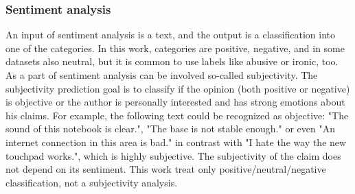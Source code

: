 \subsubsection{Sentiment analysis}
An input of sentiment analysis is a text, and the output is a classification into one of the categories. In this work, categories are positive, negative, and in some datasets also neutral, but it is common to use labels like abusive or ironic, too.
As a part of sentiment analysis can be involved so-called subjectivity\citep{Montoyo2012}. The subjectivity prediction goal is to classify if the
opinion (both positive or negative) is objective or the author is personally interested and has strong emotions about his claims. For example, the following text could be recognized as objective: "The sound of this notebook is clear.", "The base is not stable enough." or even "An internet connection in this area is bad." in contrast with "I hate the way the new touchpad works.", which is highly subjective. The subjectivity of the claim does not depend on its sentiment. This work treat only positive/neutral/negative classification, not a subjectivity analysis.

